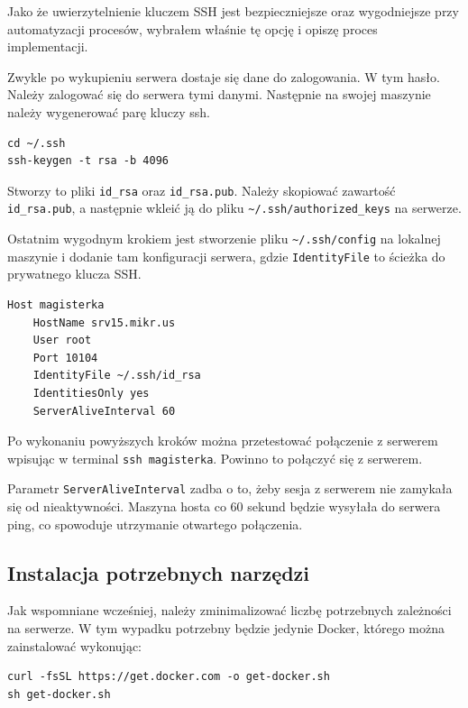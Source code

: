 \documentclass{article}
\begin{document}
Jako że uwierzytelnienie kluczem SSH jest bezpieczniejsze oraz wygodniejsze przy automatyzacji procesów, wybrałem właśnie tę opcję i opiszę proces implementacji.

Zwykle po wykupieniu serwera dostaje się dane do zalogowania. W tym hasło. Należy zalogować się do serwera tymi danymi. Następnie na swojej maszynie należy wygenerować parę kluczy ssh.

\begin{lstlisting}[caption=Wygenerowanie pary kluczy na swojej maszynie]
cd ~/.ssh
ssh-keygen -t rsa -b 4096
\end{lstlisting}

Stworzy to pliki \lstinline|id_rsa| oraz \lstinline|id_rsa.pub|. Należy skopiować zawartość \lstinline|id_rsa.pub|, a następnie wkleić ją do pliku \lstinline|~/.ssh/authorized_keys| na serwerze.

Ostatnim wygodnym krokiem jest stworzenie pliku \lstinline|~/.ssh/config| na lokalnej maszynie i dodanie tam konfiguracji serwera, gdzie \lstinline|IdentityFile| to ścieżka do prywatnego klucza SSH.

\begin{lstlisting}[caption=Przykładowa konfiguracja pliku config na lokalnej maszynie]
Host magisterka
    HostName srv15.mikr.us
    User root
    Port 10104
    IdentityFile ~/.ssh/id_rsa
    IdentitiesOnly yes
    ServerAliveInterval 60
\end{lstlisting}

Po wykonaniu powyższych kroków można przetestować połączenie z serwerem wpisując w terminal \lstinline|ssh magisterka|. Powinno to połączyć się z serwerem.

Parametr \lstinline|ServerAliveInterval| zadba o to, żeby sesja z serwerem nie zamykała się od nieaktywności. Maszyna hosta co 60 sekund będzie wysyłała do serwera ping, co spowoduje utrzymanie otwartego połączenia.


\subsection{Instalacja potrzebnych narzędzi}

Jak wspomniane wcześniej, należy zminimalizować liczbę potrzebnych zależności na serwerze. W tym wypadku potrzebny będzie jedynie Docker, którego można zainstalować wykonując:

\begin{lstlisting}[caption=Skrypt instalujący dockera na maszynie Ubuntu]
curl -fsSL https://get.docker.com -o get-docker.sh
sh get-docker.sh
\end{lstlisting}
\end{document}
